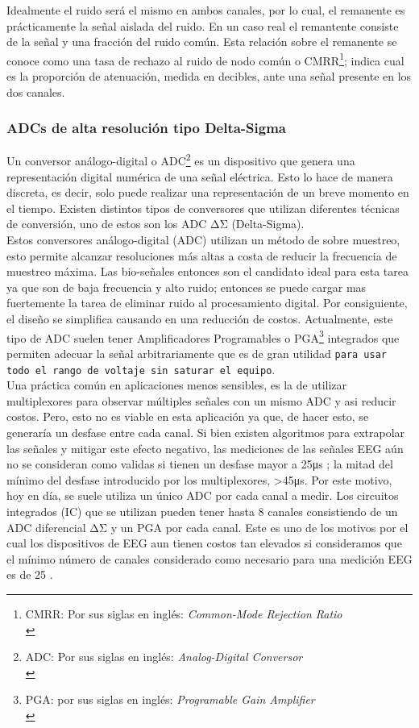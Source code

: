 Idealmente el ruido será el mismo en ambos canales, por lo cual, el remanente es prácticamente la señal aislada del ruido. En un caso real el remantente consiste de la señal y una fracción del ruido común. Esta relación sobre el remanente se conoce como una tasa de rechazo al ruido de nodo común o CMRR\footnote{CMRR: Por sus siglas en inglés: \emph{Common-Mode Rejection Ratio}\\}; indica cual es la proporción de atenuación, medida en decibles, ante una señal presente en los dos canales.\\

\subsubsection{ADCs de alta resolución tipo Delta-Sigma}
\label{sec:orgc396afc}
Un conversor análogo-digital o ADC\footnote{ADC: Por sus siglas en inglés: \emph{Analog-Digital Conversor}\\} es un dispositivo que genera una representación digital numérica de una señal eléctrica. Esto lo hace de manera discreta, es decir, solo puede realizar una representación de un breve momento en el tiempo. Existen distintos tipos de conversores que utilizan diferentes técnicas de conversión, uno de estos son los ADC ΔΣ (Delta-Sigma).\\

Estos conversores análogo-digital (ADC) utilizan un método de sobre muestreo, esto permite alcanzar resoluciones más altas a costa de reducir la frecuencia de muestreo máxima. Las bio-señales entonces son el candidato ideal para esta tarea ya que son de baja frecuencia y alto ruido; entonces se puede cargar mas fuertemente la tarea de eliminar ruido al procesamiento digital. Por consiguiente, el diseño se simplifica causando en una reducción de costos. Actualmente, este tipo de ADC suelen tener Amplificadores Programables o PGA\footnote{PGA: por sus siglas en inglés: \emph{Programable Gain Amplifier}\\} integrados que permiten adecuar la señal arbitrariamente que es de gran utilidad \texttt{para usar todo el rango de voltaje sin saturar el equipo}.\\

Una práctica común en aplicaciones menos sensibles, es la de utilizar multiplexores para observar múltiples señales con un mismo ADC y asi reducir costos. Pero, esto no es viable en esta aplicación ya que, de hacer esto, se generaría un desfase entre cada canal. Si bien existen algoritmos para extrapolar las señales y mitigar este efecto negativo, las mediciones de las señales EEG aún no se consideran como validas si tienen un desfase mayor a 25μs \cite{IFCN1999a}; la mitad del mínimo del desfase introducido por los multiplexores, >45μs. Por este motivo, hoy en día, se suele utiliza un único ADC por cada canal a medir. Los circuitos integrados (IC) que se utilizan pueden tener hasta 8 canales consistiendo de un ADC diferencial ΔΣ y un PGA por cada canal. Este es uno de los motivos por el cual los dispositivos de EEG aun tienen costos tan elevados si consideramos que el mínimo número de canales considerado como necesario para una medición EEG es de 25 \cite{IFCN1999a}.\\

